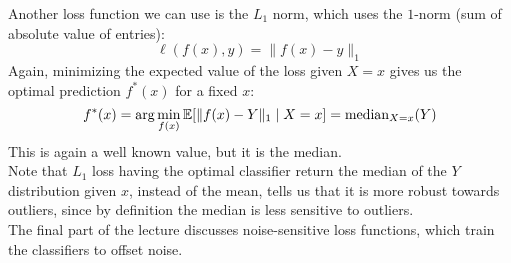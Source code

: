 \documentclass[12pt]{article}
\begin{document}
Another loss function we can use is the
$L_1$ norm,
which uses the $1$-norm
(sum of absolute value of entries):
\[ \ell(f(x), y) = \|f(x) - y\|_1 \]
Again, minimizing the expected value of the
loss given $X = x$
gives us the optimal prediction $f^*(x)$
for a fixed $x$:
\[ f^*(x) = \arg\min_{f(x)}
\mathbb{E}[\|f(x) - Y\|_1  \mid X = x]
= \text{median}_{X=x}(Y) \]
This is again a well known value, but it 
is the median. \\

Note that $L_1$ loss having the optimal classifier
return the median of the $Y$ distribution given $x$,
instead of the mean,
tells us that it is more robust towards outliers,
since by definition the median
is less sensitive to outliers. \\

The final part of the lecture discusses
noise-sensitive loss functions,
which train the classifiers to offset noise. \\

\newpage
\end{document}
